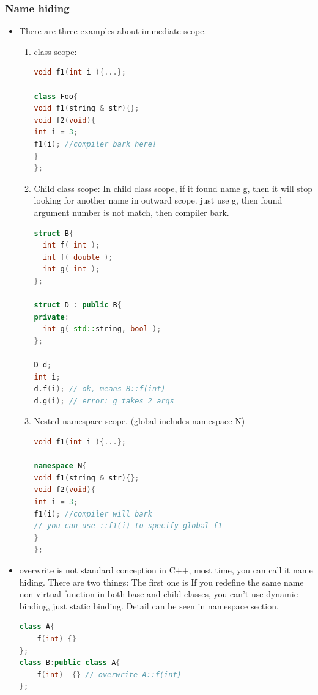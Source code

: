 \documentclass[a4paper,12pt,twoside]{book}
\begin{document}
\subsubsection{Name hiding}
\begin{itemize}

\item There are three examples about immediate scope.
\begin{enumerate}
\item class scope:
\begin{lstlisting}[frame=single, language=c++]
void f1(int i ){...};

class Foo{
void f1(string & str){};
void f2(void){
int i = 3;
f1(i); //compiler bark here!
}
};
\end{lstlisting}

\item Child class scope: In child class scope, if it found name g, then it will stop looking for another name in outward scope. just use g, then found argument number is not match, then compiler bark.
\begin{lstlisting}[frame=single, language=c++]
struct B{
  int f( int );
  int f( double );
  int g( int );
};

struct D : public B{
private:
  int g( std::string, bool );
};

D d;
int i;
d.f(i); // ok, means B::f(int)
d.g(i); // error: g takes 2 args
\end{lstlisting}

\item Nested namespace scope. (global includes namespace N)
\begin{lstlisting}[frame=single, language=c++]
void f1(int i ){...};

namespace N{
void f1(string & str){};
void f2(void){
int i = 3;
f1(i); //compiler will bark
// you can use ::f1(i) to specify global f1
}
};
\end{lstlisting}
\end{enumerate}


\item overwrite is not standard conception in C++, most time, you can call it name hiding. There are two things: The first one is If you redefine the same name non-virtual function in both base and child classes, you can't use dynamic binding, just static binding.  Detail can be seen in namespace section.
\begin{lstlisting}[frame=single, language=c++]
class A{
    f(int) {}
};
class B:public class A{
    f(int)  {} // overwrite A::f(int)
};


\end{lstlisting}
\end{itemize}
\end{document}
